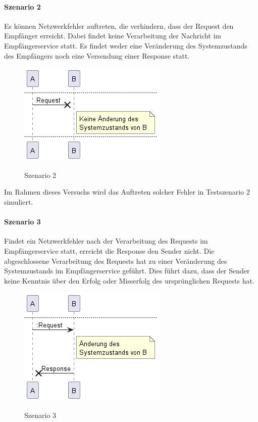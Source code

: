 \paragraph*{Szenario 2}
Es können Netzwerkfehler auftreten, die verhindern, dass der Request den Empfänger erreicht. Dabei findet keine Verarbeitung der Nachricht im Empfängerservice statt. Es findet weder eine Veränderung des Systemzustands des Empfängers noch eine Versendung einer Response statt.

\begin{figure}[H]
	\centering
	\includegraphics[width=.4\linewidth]{figures/ChapterVersuchsvorbereitung/TestSzenarien-1.png}
	\label{fig:Testszenario2}
	\caption{Szenario 2}
\end{figure}
\FloatBarrier

Im Rahmen dieses Versuchs wird das Auftreten solcher Fehler in Testszenario 2 simuliert. 

\paragraph*{Szenario 3}
Findet ein Netzwerkfehler nach der Verarbeitung des Requests im Empfängerservice statt, erreicht die Response den Sender nicht. Die abgeschlossene Verarbeitung des Requests hat zu einer Veränderung des Systemzustands im Empfängerservice geführt. Dies führt dazu, dass der Sender keine Kenntnis über den Erfolg oder Misserfolg des ursprünglichen Requests hat.

\begin{figure}[H]
	\centering
	\includegraphics[width=.4\linewidth]{figures/ChapterVersuchsvorbereitung/TestSzenarien-2.png}
	\label{fig:Testszenario3}
	\caption{Szenario 3}
\end{figure}
\FloatBarrier

